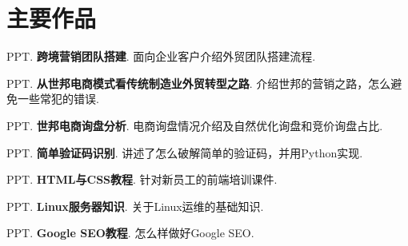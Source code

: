 \section{\textbf{主要作品}}
 \resumeSubHeadingListStart
    \item{
      PPT.
      \textbf{跨境营销团队搭建}.
      面向企业客户介绍外贸团队搭建流程.
    }
    \item{
      PPT.
      \textbf{从世邦电商模式看传统制造业外贸转型之路}.
      介绍世邦的营销之路，怎么避免一些常犯的错误.
    }
    \item{
      PPT.
      \textbf{世邦电商询盘分析}.
      电商询盘情况介绍及自然优化询盘和竞价询盘占比.
    }
    \item{
        PPT.
        \textbf{简单验证码识别}.
        讲述了怎么破解简单的验证码，并用Python实现.
    }
    \item{
      PPT.
      \textbf{HTML与CSS教程}.
      针对新员工的前端培训课件.
    }
   \item{
       PPT.
       \textbf{Linux服务器知识}.
       关于Linux运维的基础知识.
   }
   \item{
       PPT.
       \textbf{Google SEO教程}.
       怎么样做好Google SEO.
   }
 \resumeSubHeadingListEnd

